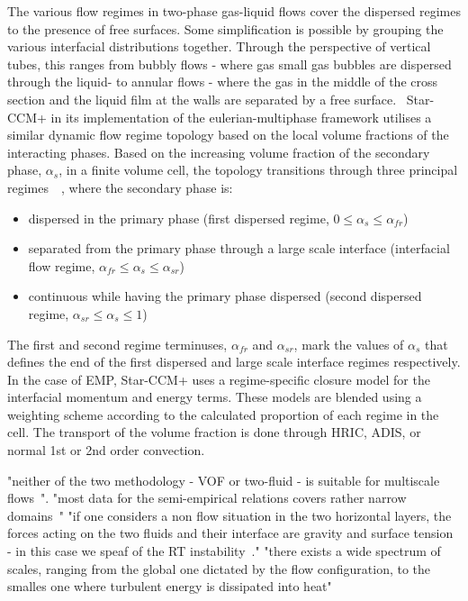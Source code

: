 The various flow regimes in two-phase gas-liquid flows cover the dispersed 
 regimes to the presence of free surfaces. Some simplification is possible by grouping 
 the various interfacial distributions together. Through the perspective of 
 vertical tubes, this ranges from bubbly flows - 
 where gas small gas bubbles are dispersed through the liquid- to annular 
 flows - where the gas in the middle of the cross section 
 and the liquid film at the walls are separated by a free surface.~\cite{yadigarogluNatureMultiphaseFlows2018}
 Star-CCM+ in its implementation of the eulerian-multiphase framework utilises a similar
 dynamic flow regime topology based on the local volume fractions
 of the interacting phases. Based on the increasing volume fraction of the
 secondary phase, $\alpha_{s}$, in a finite volume cell,
 the topology transitions through three principal 
 regimes~\cite{gadaLargeScaleInterface2017}~, where the secondary phase is:
 \begin{itemize}
    \item dispersed in the primary phase (first dispersed regime, $0 \le \alpha_{s} \le \alpha_{fr} $)
    \item separated from the primary phase through a large scale interface (interfacial flow regime, $\alpha_{fr} \le \alpha_{s} \le \alpha_{sr} $) 
    \item continuous while having the primary phase dispersed (second dispersed regime, $\alpha_{sr} \le \alpha_{s} \le 1 $)
 \end{itemize}
The first and second regime terminuses, $\alpha_{fr}$ and $\alpha_{sr}$, mark the values of $\alpha_{s}$
that defines the end of the first dispersed and large scale interface regimes respectively. In the case 
 of EMP, Star-CCM+ uses a regime-specific closure model for 
 the interfacial momentum and energy terms. These models are blended using a weighting
 scheme according to the calculated proportion of each regime in the cell.
 The transport of the volume fraction is done through HRIC, ADIS, or normal 1st or 2nd order convection.

"neither of the two methodology - VOF or two-fluid - is suitable for multiscale flows~\cite{gadaLargeScaleInterface2017}".
"most data for the semi-empirical relations covers rather narrow domains~\cite{yadigarogluNatureMultiphaseFlows2018}"
"if one considers a non flow situation in the two horizontal layers, the forces acting on the 
two fluids and their interface are gravity and surface tension - in this case we speaf of
the RT instability~\cite{hewittModellingStrategiesTwoPhase2018}."
"there exists a wide spectrum of scales, ranging from the global one dictated by the flow
configuration, to the smalles one where turbulent energy is dissipated into heat\cite{shyyComputationalTechniquesComplex1997}"

